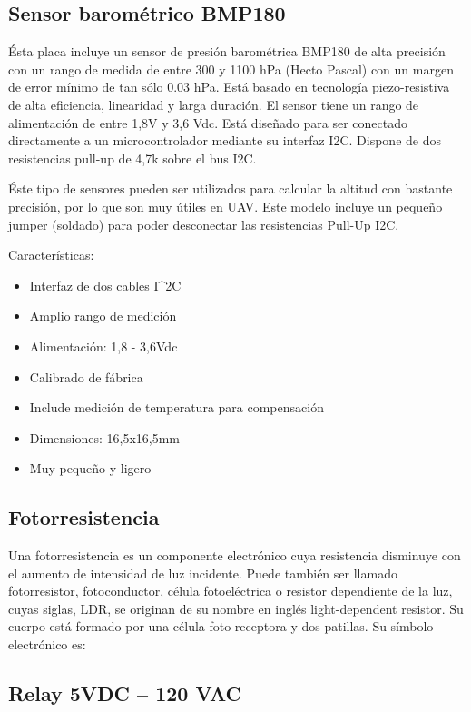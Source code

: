 \documentclass{article}
\begin{document}
\subsection{Sensor barométrico BMP180}

Ésta placa incluye un sensor de presión barométrica BMP180 de alta precisión con un rango de medida de entre 300 y 1100 hPa (Hecto Pascal) con un margen de error mínimo de tan sólo 0.03 hPa. Está basado en tecnología piezo-resistiva de alta eficiencia, linearidad y larga duración. El sensor tiene un rango de alimentación de entre 1,8V y 3,6 Vdc. Está diseñado para ser conectado directamente a un microcontrolador mediante su interfaz I2C. Dispone de dos resistencias pull-up de 4,7k sobre el bus I2C.

Éste tipo de sensores pueden ser utilizados para calcular la altitud con bastante precisión, por lo que son muy útiles en UAV. Este modelo incluye un pequeño jumper (soldado) para poder desconectar las resistencias Pull-Up I2C.

Características:
\begin{itemize}
	\item Interfaz de dos cables I^2C
	\item Amplio rango de medición
	\item Alimentación: 1,8 - 3,6Vdc
	\item Calibrado de fábrica
	\item Include medición de temperatura para compensación
	\item Dimensiones: 16,5x16,5mm
	\item Muy pequeño y ligero
\end{itemize}

\subsection{Fotorresistencia}

Una fotorresistencia es un componente electrónico cuya resistencia disminuye con el aumento de intensidad de luz incidente. Puede también ser llamado fotorresistor, fotoconductor, célula fotoeléctrica o resistor dependiente de la luz, cuyas siglas, LDR, se originan de su nombre en inglés light-dependent resistor. Su cuerpo está formado por una célula foto receptora y dos patillas. Su símbolo electrónico es:

\subsection{Relay 5VDC – 120 VAC}
\end{document}
